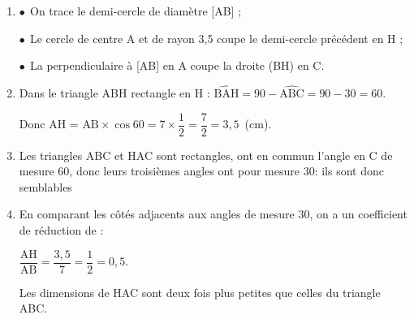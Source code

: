 
\medskip

%
%

\begin{enumerate}
\item %
$\bullet~~$On trace le demi-cercle de diamètre [AB] ; 

$\bullet~~$Le cercle de centre A et de rayon 3,5 coupe le demi-cercle précédent en H ;

$\bullet~~$La perpendiculaire à [AB] en A coupe la droite (BH) en C.
\item %
Dans le triangle ABH rectangle en H : $\widehat{\text{BAH}} = 90 - \widehat{\text{ABC}} = 90 - 30 = 60$\degres.

Donc AH = $ \text{AB} \times \cos 60 = 7 \times \dfrac{1}{2} = \dfrac{7}{2} = 3,5$~(cm).
\item %
Les triangles ABC et HAC sont rectangles, ont en commun l'angle en C de mesure 60\degres, donc leurs troisièmes angles ont pour mesure 30\degres : ils sont donc semblables
\item %
En comparant les côtés adjacents aux angles de mesure 30\degres, on a un coefficient de réduction de :

$\dfrac{\text{AH}}{\text{AB}} = \dfrac{3,5}{7} = \dfrac{1}{2} = 0,5$.

Les dimensions de HAC sont deux fois plus petites que celles du triangle ABC.
\end{enumerate}


